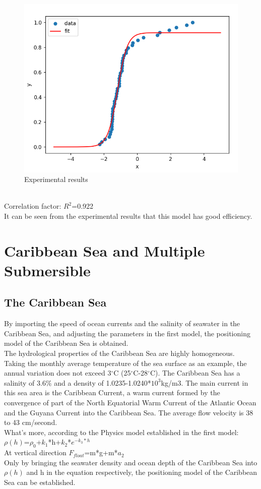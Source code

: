 \documentclass[12pt]{article}  %
\begin{document}
        \begin{figure}[htbp]  %
            \centering  %
            \includegraphics[width=.7\textwidth]{probability.png} %
            \caption{Experimental results} %
            \end{figure}
            \vspace{-0.8cm}
    \indent \\
           \indent Correlation factor: $R^{2}$=0.922\\
\indent It can be seen from the experimental results that this model has good efficiency.

    \section{Caribbean Sea and Multiple Submersible} %
\subsection{The Caribbean Sea}
    \indent By importing the speed of ocean currents and the salinity of seawater in the Caribbean Sea, and adjusting the parameters in the first model, the positioning model of the Caribbean Sea is obtained.\\
\indent The hydrological properties of the Caribbean Sea are highly homogeneous. Taking the monthly average temperature of the sea surface as an example, the annual variation does not exceed 3$^{\circ}$C (25$^{\circ}$C-28$^{\circ}$C). The Caribbean Sea has a salinity of 3.6$\%$ and a density of 1.0235-1.0240*$10^{3}$kg/m3. The main current in this sea area is the Caribbean Current, a warm current formed by the convergence of part of the North Equatorial Warm Current of the Atlantic Ocean and the Guyana Current into the Caribbean Sea. The average flow velocity is 38 to 43 cm/second.\\
\indent What's more, according to the Physics model established in the first model:\\
\indent  $\rho(h)$=$\rho_0$+$k_1$*h+$k_2$*$e^{-k_3*h}$\\
\indent At vertical direction $F_{float}$=m*g+m*$a_2$\\
\indent Only by bringing the seawater density and ocean depth of the Caribbean Sea into $\rho(h)$ and h in the equation respectively, the positioning model of the Caribbean Sea can be established.
\end{document}

